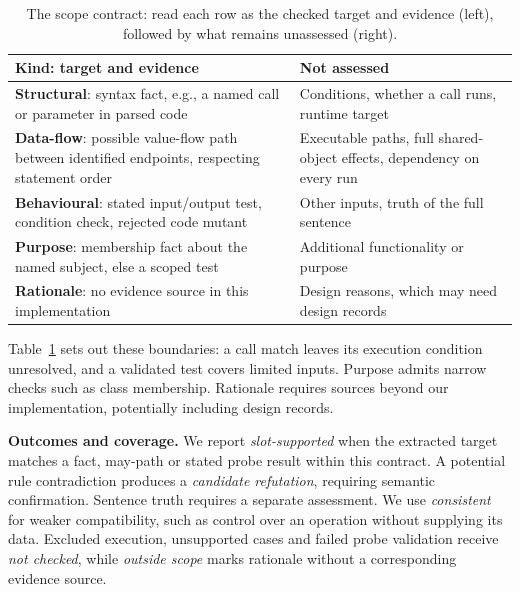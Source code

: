 \begin{table}[t]
\centering\caption{The scope contract: read each row as the checked target and evidence (left), followed by what remains unassessed (right).}
\label{tab:contract}\footnotesize\setlength{\tabcolsep}{4pt}\renewcommand{\arraystretch}{1.05}
\begin{tabular}{@{}>{\raggedright\arraybackslash}p{}>{\raggedright\arraybackslash}p{}@{}}\toprule
\textbf{Kind: target and evidence} & \textbf{Not assessed} \\\midrule
\textbf{Structural}: syntax fact, e.g., a named call or parameter in parsed code & Conditions, whether a call runs, runtime target \\\addlinespace[2pt]
\textbf{Data-flow}: possible value-flow path between identified endpoints, respecting statement order & Executable paths, full shared-object effects, dependency on every run \\\addlinespace[2pt]
\textbf{Behavioural}: stated input/output test, condition check, rejected code mutant & Other inputs, truth of the full sentence \\\addlinespace[2pt]
\textbf{Purpose}: membership fact about the named subject, else a scoped test & Additional functionality or purpose \\\addlinespace[2pt]
\textbf{Rationale}: no evidence source in this implementation & Design reasons, which may need design records \\\bottomrule
\end{tabular}\end{table}

Table~\ref{tab:contract} sets out these boundaries: a call match leaves its execution condition unresolved, and a validated test covers limited inputs. Purpose admits narrow checks such as class membership. Rationale requires sources beyond our implementation, potentially including design records.

\noindent\textbf{Outcomes and coverage.} We report \emph{slot-supported} when the extracted target matches a fact, may-path or stated probe result within this contract. A potential rule contradiction produces a \emph{candidate refutation}, requiring semantic confirmation. Sentence truth requires a separate assessment. We use \emph{consistent} for weaker compatibility, such as control over an operation without supplying its data. Excluded execution, unsupported cases and failed probe validation receive \emph{not checked}, while \emph{outside scope} marks rationale without a corresponding evidence source.

